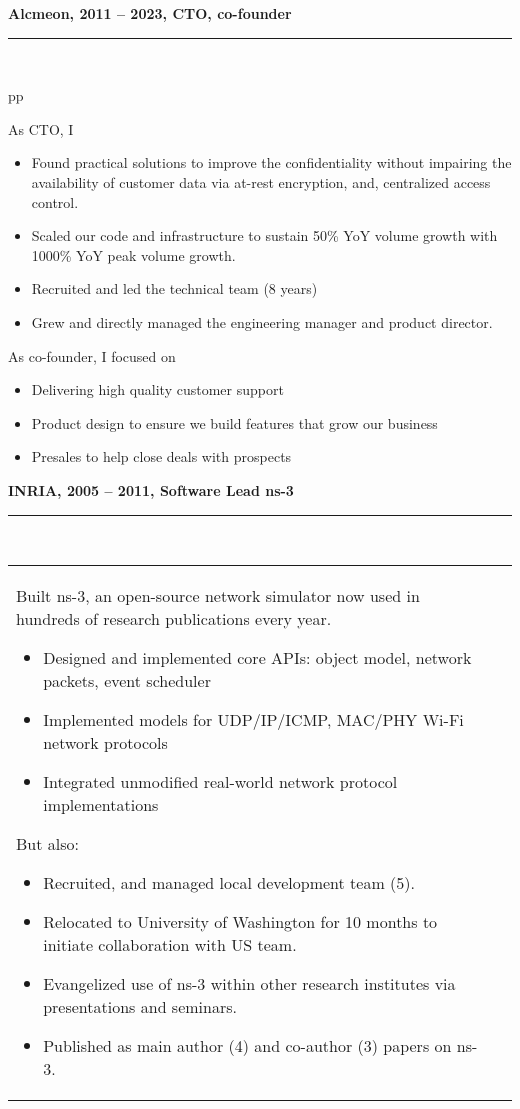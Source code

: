 \documentclass[a4paper,12pt]{article}
\newcommand{\ligne}[1]{\rule[0.5ex]{\textwidth}{#1}\\}
\newcommand{\styleRub}[1]{\textbf{\large #1}\par}
\newcommand{\indentStd}{\noindent\hspace*{10pt}}
\newenvironment{rubrique}[2][\linewidth]%
{\styleRub{#2}%
\ligne{0.5mm}
\setlength{\lenB}{#1}%
\setlength{\lenC}{\linewidth}%
\addtolength{\lenC}{-\lenA}%
\addtolength{\lenC}{-\lenB}%
\addtolength{\lenC}{-19pt}
\indentStd\begin{tabular}[t]{p{\lenB}p{\lenC}}}
{\end{tabular}}
\newlength{\lenA} %
\newlength{\lenB} %
\newlength{\lenC} %
\begin{document}
\begin{rubrique}{Alcmeon, 2011 -- 2023, CTO, co-founder}

As CTO, I 
\begin{itemize}
\item Found practical solutions to improve the confidentiality 
        without impairing the availability of customer data via 
        at-rest encryption, and, centralized access control.
\item Scaled our code and infrastructure to sustain
        50\% YoY volume growth with 1000\% YoY peak volume growth.
\item Recruited and led the technical team (8 years)
\item Grew and directly managed the engineering manager and product
        director.
\end{itemize}


As co-founder, I focused on
\begin{itemize}
\item Delivering high quality customer support
\item Product design to ensure we build features that grow our business
\item Presales to help close deals with prospects
\end{itemize}

\end{rubrique}

\pagebreak

\begin{rubrique}{INRIA, 2005 -- 2011, Software Lead ns-3}
  Built ns-3, an open-source network simulator now used in hundreds of research publications every year. 
 
  \begin{itemize}
  \item Designed and implemented core APIs: object model, network packets, event scheduler
  \item Implemented models for UDP/IP/ICMP, MAC/PHY Wi-Fi network protocols
  \item Integrated unmodified real-world network protocol implementations
  \end{itemize}

  But also:
  \begin{itemize}
  \item Recruited, and managed local development team (5).
  \item Relocated to University of Washington for 10 months to initiate collaboration with US team.
  \item Evangelized use of ns-3 within other research institutes via
    presentations and seminars.
  \item Published as main author (4) and co-author (3) papers on ns-3.
  \end{itemize}

\end{rubrique}
\end{document}
